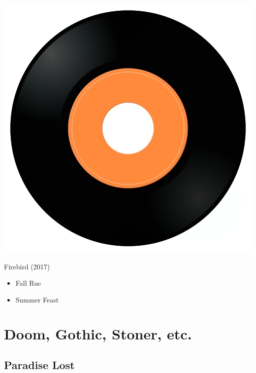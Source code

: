 \begin{minipage}[t]{0.25\textwidth}
\captionsetup{type=figure}
\includegraphics[width=\textwidth]{Images/cover.png}
\caption*{Firebird (2017)}
\end{minipage}
\begin{minipage}[t]{0.25\textwidth}\vspace{0pt}
\begin{itemize}[nosep,leftmargin=1em,labelwidth=*,align=left]
	\setlength{\itemsep}{0pt}
	\item Fall Rue
	\item Summer Feast
\end{itemize}
\end{minipage}


\section{Doom, Gothic, Stoner, etc.}

\subsection{Paradise Lost}

